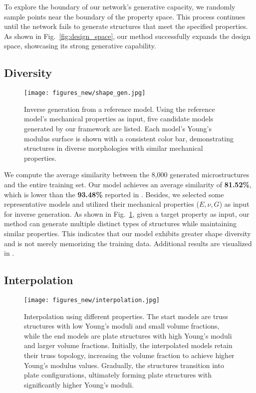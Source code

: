 To explore the boundary of our network’s generative capacity, we randomly sample points near the boundary of the property space. 
This process continues until the network fails to generate structures that meet the specified properties. 
As shown in Fig.~\ref{fig:design_space}, our method successfully expands the design space, showcasing its strong generative capability.



\subsection{Diversity}

\begin{figure}
    \centering
    \texttt{[image: figures\_new/shape\_gen.jpg]}
\caption{Inverse generation from a reference model.
Using the reference model's mechanical properties as input, five candidate models generated by our framework are listed.
Each model's Young's modulus surface is shown with a consistent color bar, demonstrating structures in diverse morphologies with similar mechanical properties.}
    \label{fig:shape_gen}
\end{figure} 


We compute the average similarity between the 8,000 generated microstructures and the entire training set. 
Our model achieves an average similarity of \textbf{81.52\%}, which is lower than the \textbf{93.48\%} reported in \cite{Yang2024}. 
Besides, we selected some representative models and utilized their mechanical properties ($E, \nu, G$) as input for inverse generation.
As shown in Fig.~\ref{fig:shape_gen}, given a target property as input, our method can generate multiple distinct types of structures while maintaining similar properties.
This indicates that our model exhibits greater shape diversity and is not merely memorizing the training data. 
Additional results are visualized in \srefmorevis.


\subsection{Interpolation}

\begin{figure}
    \centering
    \texttt{[image: figures\_new/interpolation.jpg]}
    \caption{Interpolation using different properties.
    The start models are truss structures with low Young’s moduli and small volume fractions, while the end models are plate structures with high Young’s moduli and larger volume fractions.
    Initially, the interpolated models retain their truss topology, increasing the volume fraction to achieve higher Young’s modulus values.
    Gradually, the structures transition into plate configurations, ultimately forming plate structures with significantly higher Young’s moduli.
    }
    \label{fig:interpolation}
\end{figure} 

